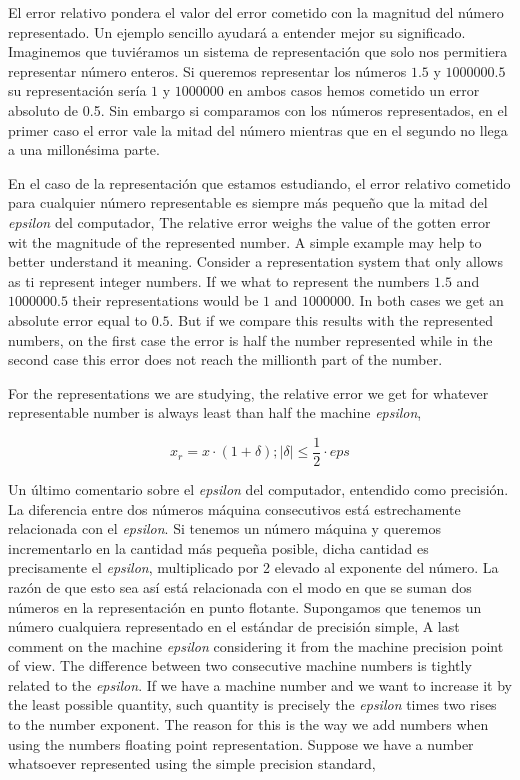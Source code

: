 \begin{paracol}{2}
El error relativo pondera el valor del error cometido con la magnitud del número representado.  Un ejemplo sencillo ayudará a entender mejor su significado. Imaginemos que tuviéramos un sistema de representación que solo nos permitiera representar número enteros. Si queremos representar los números $1.5$ y $1000000.5$ su representación sería $1$ y $1000000$ en ambos casos hemos cometido un error absoluto de 0.5. Sin embargo si comparamos con los números representados, en el primer caso el error vale la mitad del número mientras que en el segundo no llega a una millonésima parte.

En el caso de la representación que estamos estudiando, el error relativo cometido para cualquier número representable es siempre más pequeño que la mitad del \emph{epsilon} del computador,
\switchcolumn
The relative error weighs the value of the gotten error wit the magnitude of the represented number. A simple example may help to better understand it meaning. Consider a representation system that only allows as ti represent integer numbers. If we what to represent the numbers $1.5$ and $1000000.5$ their representations would be $1$ and $1000000$. In both cases we get an absolute error equal to $0.5$. But if we compare this results with the represented numbers, on the first case the error is half the number represented while in the second case this error does not reach the millionth part of the number.

For the representations we are studying, the relative error we get for whatever representable number is always least than half the machine \emph{epsilon},     
\end{paracol}

\begin{equation*}
x_r=x\cdot (1+ \delta); | \delta| \leq \frac{1}{2}\cdot eps
\end{equation*}

\begin{paracol}{2}
Un último comentario sobre el \emph{epsilon} del computador, entendido como precisión. La diferencia entre dos números máquina consecutivos está estrechamente  relacionada con el \emph{epsilon}. Si tenemos un número máquina y queremos incrementarlo en la cantidad más pequeña posible, dicha cantidad es precisamente el \emph{epsilon}, multiplicado por 2 elevado al exponente del número. La razón de que esto sea así está relacionada con el modo en que se suman dos números en la representación en punto flotante. Supongamos que tenemos un número cualquiera representado en el estándar de precisión simple,
\switchcolumn
A last comment on the machine \emph{epsilon} considering it from the machine precision point of view. The difference between two consecutive machine numbers is tightly related to the \emph{epsilon}. If we have a machine number and we want to increase it by the least possible quantity, such quantity is precisely the \emph{epsilon} times two rises to the number exponent. The reason for this is the way we add numbers when using the numbers floating point representation. Suppose we have a number whatsoever represented using the simple precision standard,  
\end{paracol}

